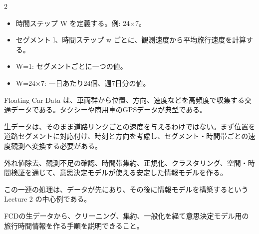 \begin{multicols}{2}

\footnotesize

\raggedcolumns


\begin{itemize}
\item 時間ステップ W を定義する。例: 24×7。
\item セグメント l、時間ステップ w ごとに、観測速度から平均旅行速度を計算する。
\item W=1: セグメントごとに一つの値。
\item W=24×7: 一日あたり24個、週7日分の値。
\end{itemize}

Floating Car Data は、車両群から位置、方向、速度などを高頻度で収集する交通データである。タクシーや商用車のGPSデータが典型である。\par

生データは、そのまま道路リンクごとの速度を与えるわけではない。まず位置を道路セグメントに対応付け、時刻と方向を考慮し、セグメント・時間帯ごとの速度観測へ変換する必要がある。\par

外れ値除去、観測不足の確認、時間帯集約、正規化、クラスタリング、空間・時間検証を通じて、意思決定モデルが使える安定した情報モデルを作る。\par

この一連の処理は、データが先にあり、その後に情報モデルを構築するという Lecture 2 の中心例である。\par

FCDの生データから、クリーニング、集約、一般化を経て意思決定モデル用の旅行時間情報を作る手順を説明できること。\par



\end{multicols}
